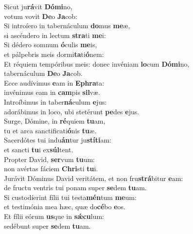 \evenverse Sicut ju\textbf{rá}vit \textbf{Dó}\textbf{mi}no,~\*\\
\evenverse votum vovit \textbf{De}o \textbf{Ja}cob:\\
\oddverse Si introíero in tabernáculum \textbf{do}mus \textbf{me}æ,~\*\\
\oddverse si ascéndero in lectum \textbf{stra}ti \textbf{me}i:\\
\evenverse Si dédero somnum \textbf{ó}culis \textbf{me}is,~\*\\
\evenverse et pálpebris meis dormi\textbf{ta}ti\textbf{ó}nem:\\
\oddverse Et réquiem tempóribus meis: donec invéniam \textbf{lo}cum \textbf{Dó}\textbf{mi}no,~\*\\
\oddverse tabernáculum \textbf{De}o \textbf{Ja}cob.\\
\evenverse Ecce audívimus \textbf{e}am in \textbf{E}\textbf{phra}ta:~\*\\
\evenverse invénimus eam in \textbf{cam}pis \textbf{sil}væ.\\
\oddverse Introíbimus in taber\textbf{ná}culum \textbf{e}jus:~\*\\
\oddverse adorábimus in loco, ubi stetérunt \textbf{pe}des \textbf{e}jus.\\
\evenverse Surge, Dómine, in \textbf{ré}quiem \textbf{tu}am,~\*\\
\evenverse tu et arca sanctificati\textbf{ó}nis \textbf{tu}æ.\\
\oddverse Sacerdótes tui indu\textbf{án}tur ju\textbf{stí}\textbf{ti}am:~\*\\
\oddverse et sancti \textbf{tu}i ex\textbf{súl}tent.\\
\evenverse Propter David, \textbf{ser}vum \textbf{tu}um:~\*\\
\evenverse non avértas fáciem \textbf{Chri}sti \textbf{tu}i.\\
\oddverse Jurávit Dóminus David veritátem, et non fru\textbf{strá}bitur \textbf{e}am:~\*\\
\oddverse de fructu ventris tui ponam super \textbf{se}dem \textbf{tu}am.\\
\evenverse Si custodíerint fílii tui testa\textbf{mén}tum \textbf{me}um:~\*\\
\evenverse et testimónia mea hæc, quæ do\textbf{cé}bo \textbf{e}os.\\
\oddverse Et fílii eórum \textbf{us}que in \textbf{sǽ}\textbf{cu}lum:~\*\\
\oddverse sedébunt super \textbf{se}dem \textbf{tu}am.\\
